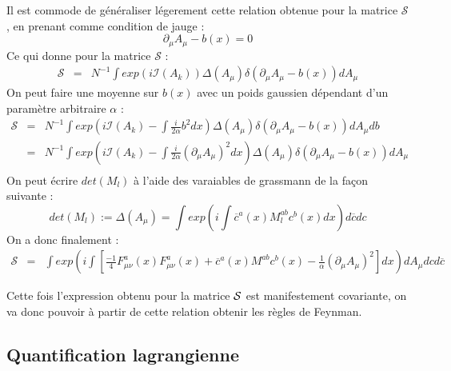\documentclass[a4paper,11pt]{article}
\theoremstyle{plain}
\theoremstyle{definition}
\theoremstyle{remark}
\numberwithin{equation}{section}
\numberwithin{equation}{subsection}
\numberwithin{figure}{section}
\begin{document}
\noindent
Il est commode de généraliser légerement cette relation obtenue pour la matrice $\mathcal{S}$ , en prenant comme condition de jauge :
\begin{equation}
 \partial_{\mu}A_{\mu} - b(x) = 0
\end{equation}
Ce qui donne pour la matrice $\mathcal{S}$ : 
\begin{eqnarray}
\mathcal{S} &=& N^{-1} \int exp\left( i \mathcal{I}(A_{k}) \right) \Delta(A_{\mu}) \delta \left(\partial_{\mu}A_{\mu} - b(x) \right) dA_{\mu}
\end{eqnarray}
On peut faire une moyenne sur $b(x)$ avec un poids gaussien dépendant d'un paramètre arbitraire $\alpha$ : 
\begin{eqnarray}
\mathcal{S} &=& N^{-1} \int exp\left( i \mathcal{I}(A_{k}) - \int \frac{i}{2\alpha} b^2  dx \right) \Delta(A_{\mu}) \delta \left(\partial_{\mu}A_{\mu} - b(x) \right) dA_{\mu} db \\
                      &=& N^{-1} \int exp\left( i \mathcal{I}(A_{k}) - \int \frac{i}{2\alpha} (\partial_{\mu}A_{\mu})^2  dx \right)
\Delta(A_{\mu}) \delta \left(\partial_{\mu}A_{\mu} - b(x) \right) dA_{\mu} \nonumber \\ 
\end{eqnarray}
On peut écrire $det(M_{l})$ à l'aide des varaiables de grassmann de la façon suivante :
\begin{equation}
 det(M_{l}) := \Delta(A_{\mu}) = \int exp \left(i \int \overline{c}^{a}(x)M_{l}^{ab}c^{b}(x) dx \right) d\overline{c} dc 
\end{equation}
On a donc finalement :
\begin{eqnarray}
 \mathcal{S} &=& \int exp\left(i \int \left[  
\frac{-1}{4} F^{a}_{\mu\nu}(x)F^{a}_{\mu \nu}(x) + \overline{c}^{a}(x)M^{ab}c^{b}(x) - \frac{1}{\alpha} (\partial_{\mu}A_{\mu})^2  
\right] dx \right) dA_{\mu} dc d\overline{c}
\end{eqnarray}

\noindent
Cette fois l'expression obtenu pour la matrice $\cal{S}$ est manifestement covariante, on va donc pouvoir à partir de cette 
relation obtenir les règles de Feynman.

\subsection{Quantification lagrangienne}
\end{document}
